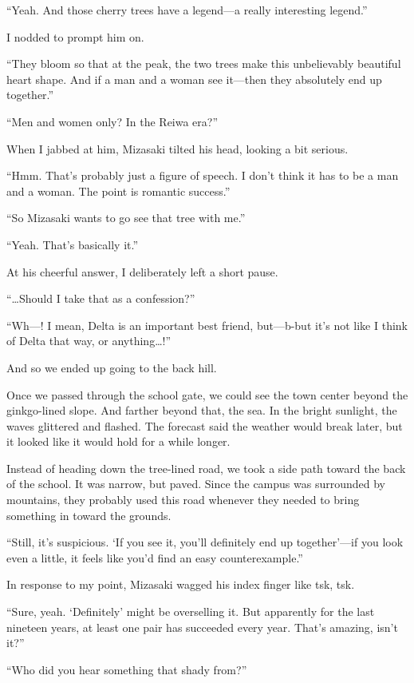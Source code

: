 \documentclass[
    a4paper,
    12pt,
    twoside,
    openany,
    UTF8,
    fontset=windows
]{ctexbook}
\begin{document}
``Yeah. And those cherry trees have a legend---a really interesting legend.''

I nodded to prompt him on.

``They bloom so that at the peak, the two trees make this unbelievably beautiful heart shape. And if a man and a woman see it---then they absolutely end up together.''

``Men and women only? In the Reiwa era?''

When I jabbed at him, Mizasaki tilted his head, looking a bit serious.

``Hmm. That's probably just a figure of speech. I don't think it has to be a man and a woman. The point is romantic success.''

``So Mizasaki wants to go see that tree with me.''

``Yeah. That's basically it.''

At his cheerful answer, I deliberately left a short pause.

``\dots Should I take that as a confession?''

``Wh---! I mean, Delta is an important best friend, but---b-but it's not like I think of Delta that way, or anything\dots!''

And so we ended up going to the back hill.

Once we passed through the school gate, we could see the town center beyond the ginkgo-lined slope. And farther beyond that, the sea. In the bright sunlight, the waves glittered and flashed. The forecast said the weather would break later, but it looked like it would hold for a while longer.

Instead of heading down the tree-lined road, we took a side path toward the back of the school. It was narrow, but paved. Since the campus was surrounded by mountains, they probably used this road whenever they needed to bring something in toward the grounds.

``Still, it's suspicious. `If you see it, you'll definitely end up together'---if you look even a little, it feels like you'd find an easy counterexample.''

In response to my point, Mizasaki wagged his index finger like tsk, tsk.

``Sure, yeah. `Definitely' might be overselling it. But apparently for the last nineteen years, at least one pair has succeeded every year. That's amazing, isn't it?''

``Who did you hear something that shady from?''
\end{document}
